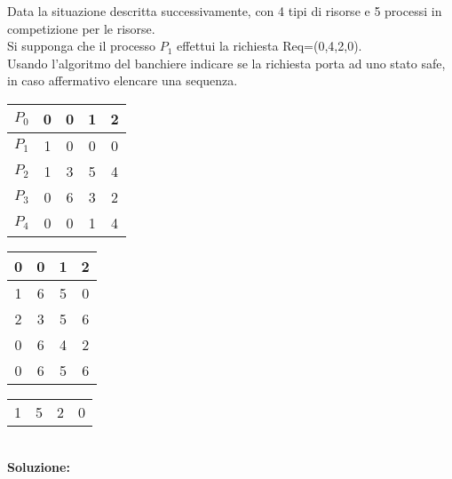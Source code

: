 \documentclass{article}
\begin{document}
    Data la situazione descritta successivamente, con 4 tipi di risorse e 5 processi in competizione per le risorse.\\
    Si supponga che il processo $P_1$ effettui la richiesta Req=(0,4,2,0).\\
    Usando l'algoritmo del banchiere indicare se la richiesta porta ad uno stato safe, in caso affermativo elencare una sequenza.\\
    \begin{minipage}[c]{0.3\textwidth}
        \centering
        \begin{tabular}{c|cccc}
            $P_0$ & 0 & 0 & 1 & 2\\
            \hline
            $P_1$ & 1 & 0 & 0 & 0\\
            \hline
            $P_2$ & 1 & 3 & 5 & 4\\
            \hline
            $P_3$ & 0 & 6 & 3 & 2\\
            \hline
            $P_4$ & 0 & 0 & 1 & 4\\
        \end{tabular}
    \end{minipage}
    \begin{minipage}[c]{0.3\textwidth}
        \centering
        \begin{tabular}{cccc}
            0 & 0 & 1 & 2\\
            \hline
            1 & 6 & 5 & 0\\
            \hline
            2 & 3 & 5 & 6\\
            \hline
            0 & 6 & 4 & 2\\
            \hline
            0 & 6 & 5 & 6\\
        \end{tabular}
    \end{minipage}
    \begin{minipage}[c]{0.3\textwidth}
        \centering
        \begin{tabular}{cccc}
            1 & 5 & 2 & 0
        \end{tabular}
    \end{minipage}\\
    \textbf{Soluzione:}
\end{document}
